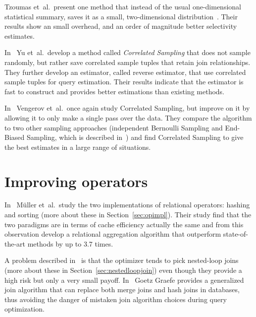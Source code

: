 Tzoumas et\ al.\ present one method that instead of the usual one-dimensional statistical summary, saves it as a small, two-dimensional distribution~\cite{tzoumas_2011_lightweight_lgmfsewia}. Their results show an small overhead, and an order of magnitude better selectivity estimates.

In~\cite{yu_2013_cs2_candsfqea} Yu et\ al.\ develop a  method called \textit{Correlated Sampling} that does not sample randomly, but rather save correlated sample tuples that retain join relationships. They further develop an estimator, called reverse estimator, that use correlated sample tuples for query estimation. Their results indicate that the estimator is fast to construct and provides better estimations than existing methods.

In~\cite{vengerov_2015_join_jsestfc} Vengerov et\ al.\ once again study Correlated Sampling, but improve on it by allowing it to only make a single pass over the data. They compare the algorithm to two other sampling approaches (independent Bernoulli Sampling and End-Biased Sampling, which is described in~\cite{estan_2006_end_esfjce}) and find Correlated Sampling to give the best estimates in a large range of situations.

\section{Improving operators}
In~\cite{muller_2015_cache_cahis} Müller  et\ al.\ study the two implementations of relational operators: hashing and sorting (more about these in Section~\ref{sec:opimpl}). Their study find that the two paradigms are in terms of cache efficiency actually the same and from this observation develop a relational aggregation algorithm that outperform state-of-the-art methods by up to 3.7 times.

A problem described in~\cite{leis_2015_how_hgaqor} is that the optimizer tends to pick nested-loop joins (more about these in Section~\ref{sec:nestedloopjoin}) even though they provide a high risk but only a very small payoff. In~\cite{graefe_2011_generalized_agja} Goetz Graefe provides a generalized join algorithm that can replace both merge joins and hash joins in databases, thus avoiding the danger of mistaken join algorithm choices during query optimization.